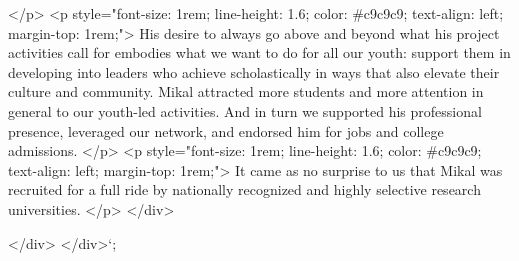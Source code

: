                 </p>
                <p style="font-size: 1rem; line-height: 1.6; color: #c9c9c9; text-align: left; margin-top: 1rem;">
                    His desire to always go above and beyond what his project activities call for embodies what we want to do for all our youth: support them in developing into leaders who achieve scholastically in ways that also elevate their culture and community. Mikal attracted more students and more attention in general to our youth-led activities. And in turn we supported his professional presence, leveraged our network, and endorsed him for jobs and college admissions.
                </p>
                <p style="font-size: 1rem; line-height: 1.6; color: #c9c9c9; text-align: left; margin-top: 1rem;">
                    It came as no surprise to us that Mikal was recruited for a full ride by nationally recognized and highly selective research universities.
                </p>
            </div>

        </div>
    </div>`;